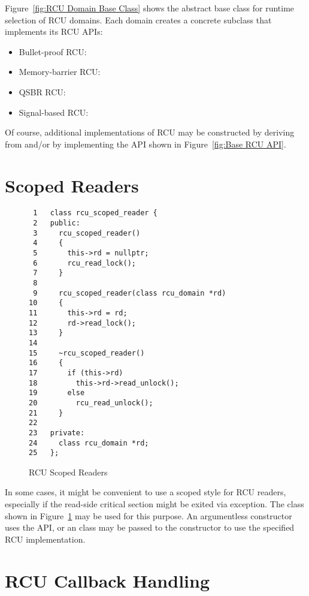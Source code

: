 \documentclass[letterpaper,twocolumn,10pt]{article}
\begin{document}
Figure~\ref{fig:RCU Domain Base Class}
shows the abstract base class for runtime selection of RCU domains.
Each domain creates a concrete subclass that implements its RCU APIs:

\begin{itemize}
\item	Bullet-proof RCU: 
\item	Memory-barrier RCU: 
\item	QSBR RCU: 
\item	Signal-based RCU: 
\end{itemize}

Of course, additional implementations of RCU may be constructed by
deriving from  and/or by implementing the API
shown in
Figure~\ref{fig:Base RCU API}.

\section{Scoped Readers}
\label{sec:Scoped Readers}

\begin{figure}[tbp]
{ \scriptsize
\begin{verbatim}
 1   class rcu_scoped_reader {
 2   public:
 3     rcu_scoped_reader()
 4     {
 5       this->rd = nullptr;
 6       rcu_read_lock();
 7     }
 8
 9     rcu_scoped_reader(class rcu_domain *rd)
10     {
11       this->rd = rd;
12       rd->read_lock();
13     }
14
15     ~rcu_scoped_reader()
16     {
17       if (this->rd)
18         this->rd->read_unlock();
19       else
20         rcu_read_unlock();
21     }
22
23   private:
24     class rcu_domain *rd;
25   };
\end{verbatim}
}
\caption{RCU Scoped Readers}
\label{fig:RCU Scoped Readers}
\end{figure}

In some cases, it might be convenient to use a scoped style for RCU readers,
especially if the read-side critical section might be exited via exception.
The  class shown in
Figure~\ref{fig:RCU Scoped Readers}
may be used for this purpose.
An argumentless constructor uses the API, or an  class
may be passed to the constructor to use the specified RCU
implementation.

\section{RCU Callback Handling}
\label{sec:RCU Callback Handling}
\end{document}
